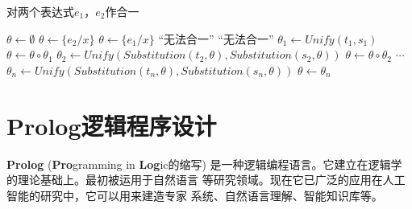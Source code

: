 \begin{algorithm}[H]
        \caption{对两个表达式$e_1$，$e_2$作合一}
        \label{algo:Unify}
        \begin{algorithmic}[1]
                        \State $\theta\gets\emptyset$
                                \State $\theta\gets \{e_2/x\}$
                                \State $\theta\gets\{e_1/x\}$
                                \State\Return ``无法合一''
                        \Else
                        \EndIf
                                \State\Return ``无法合一''
                        \Else
                                \State $\theta_1 \gets Unify(t_1, s_1)$
                                \State $\theta \gets \theta \circ \theta_1$
                                \State $\theta_2 \gets Unify(Substitution(t_2, \theta), %
                                Substitution(s_2,\theta))$
                                \State $\theta \gets \theta \circ \theta_2$
                                \State $\cdots$
                                \State $\theta_n \gets Unify(Substitution(t_n, \theta), %
                                Substitution(s_n, \theta))$
                                \State $\theta \gets \theta_n$
                                \State{}
                        \EndIf
                \EndFunction
        \end{algorithmic}
\end{algorithm}
                                        
                        

\section{Prolog逻辑程序设计}
\textbf{Prolog} ({\bfseries Pro}gramming in {\bfseries Log}ic的缩写)
是一种逻辑编程语言。它建立在逻辑学的理论基础上。最初被运用于自然语言
等研究领域。现在它已广泛的应用在人工智能的研究中，它可以用来建造专家
系统、自然语言理解、智能知识库等。
